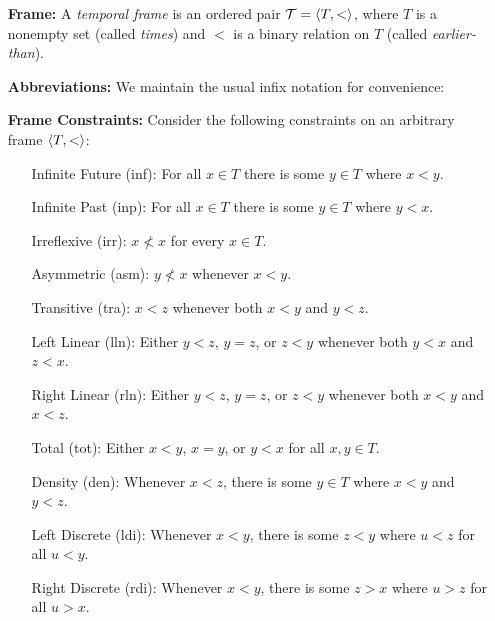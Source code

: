 \documentclass[a4paper, 11pt]{article} %
\begin{document}
\begin{enumerate}[leftmargin=1.2in] %
  \item[\bf Frame:] A \textit{temporal frame} is an ordered pair $\mathcal{T} = \langle T,<\rangle$, where $T$ is a nonempty set (called \textit{times}) and $<$ is a binary relation on $T$ (called \textit{earlier-than}).
  \item[\bf Abbreviations:] We maintain the usual infix notation for convenience:
    \begin{itemize}
    \end{itemize}
  \item[\bf Frame Constraints:]
    Consider the following constraints on an arbitrary frame $\langle T, <\rangle$:
    \begin{itemize}
      \item[\sc Infinite Future (inf):] For all $x \in T$ there is some $y \in T$ where $x < y$.
      \item[\sc Infinite Past (inp):] For all $x \in T$ there is some $y \in T$ where $y < x$.
      \item[\sc Irreflexive (irr):] $x \nless x$ for every $x\in T$.
      \item[\sc Asymmetric (asm):] $y \nless x$ whenever $x < y$. 
      \item[\sc Transitive (tra):] $x < z$ whenever both $x < y$ and $y < z$. 
      \item[\sc Left Linear (lln):] Either $y < z$, $y = z$, or $z < y$ whenever both $y < x$ and $z < x$. 
      \item[\sc Right Linear (rln):] Either $y < z$, $y = z$, or $z < y$ whenever both $x < y$ and $x < z$.
      \item[\sc Total (tot):] Either $x < y$, $x = y$, or $y < x$ for all $x,y \in T$. 
      \item[\sc Density (den):] Whenever $x < z$, there is some $y \in T$ where $x < y$ and $y < z$. 
      \item[\sc Left Discrete (ldi):] Whenever $x < y$, there is some $z < y$ where $u < z$ for all $u < y$. 
      \item[\sc Right Discrete (rdi):] Whenever $x < y$, there is some $z > x$ where $u > z$ for all $u > x$. 
    \end{itemize}
\end{enumerate}
\end{document}
